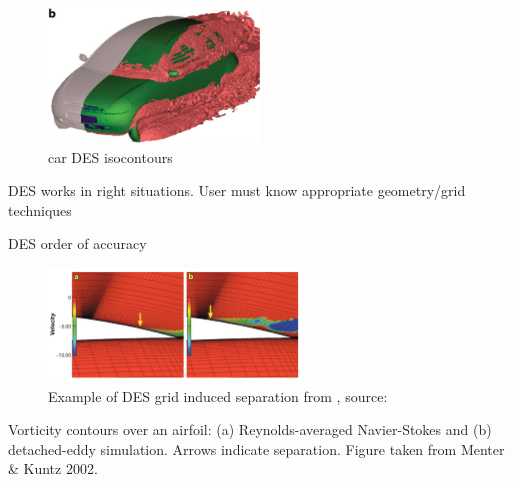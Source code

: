 \documentclass[journal]{new-aiaa}
\begin{document}
\begin{figure}[H]
\begin{center}
\includegraphics[width=0.5\textwidth]{Images/logan/spalart2009detachededdy_carDES.pdf}
\caption{ car DES isocontours \cite{mendonca2002towards} }
\label{fig:cardes}
\end{center}
\end{figure}







DES works in right situations. User must know appropriate geometry/grid techniques

DES order of accuracy


\begin{figure}[H]
\begin{center}
\includegraphics[width=0.6\textwidth]{Images/logan/spalart2009detachededdy_GridInducedSeparation.pdf}
\caption{ Example of DES grid induced separation from \cite{spalart2009detachededdy}, source: \cite{menter2004adaptation} }
\label{fig:desgridinducedseparation}
\end{center}
\end{figure}

Vorticity contours over an airfoil: (a) Reynolds-averaged Navier-Stokes and (b) detached-eddy simulation.
Arrows indicate separation. Figure taken from Menter \& Kuntz 2002.
\end{document}
